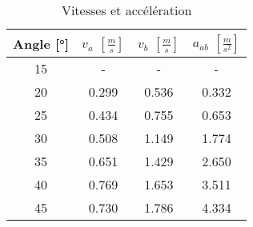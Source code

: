 \begin{table}
\centering
\begin{tabular}{|c|c|c|c|}
\hline
Angle [°] & $v_a$ $\left[ \frac{m}{s} \right]$ & $v_b$ $\left[ \frac{m}{s} \right]$ & $a_{ab}$ $\left[ \frac{m}{s^2} \right]$ \\
            \hline
15        & - & - & - \\
            \hline
20        & 0.299 & 0.536 & 0.332 \\
            \hline
25        & 0.434 & 0.755 & 0.653 \\
            \hline
30        & 0.508 & 1.149 & 1.774 \\
            \hline
35        & 0.651 & 1.429 & 2.650 \\
             \hline
40        & 0.769 & 1.653 & 3.511 \\
            \hline
45        & 0.730 & 1.786 & 4.334 \\
            \hline
\end{tabular}
\caption{Vitesses et accélération}
\label{table:v-abb}
\end{table}
